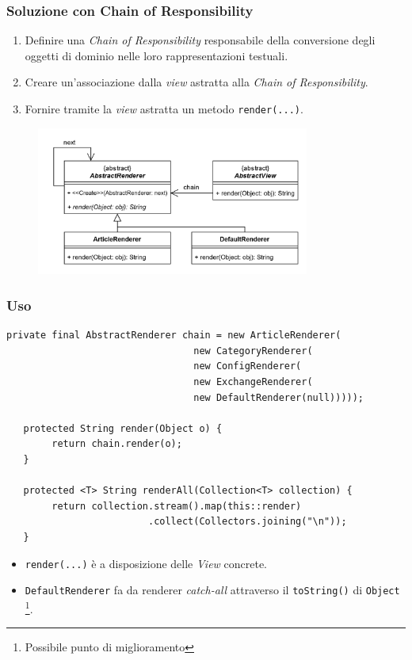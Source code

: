 \begin{frame}
    \frametitle{Soluzione con Chain of Responsibility}
    \begin{enumerate}
        \item Definire una \emph{Chain of Responsibility} responsabile della conversione degli oggetti
        di dominio nelle loro rappresentazioni testuali.
        \item Creare un'associazione dalla \emph{view} astratta alla \emph{Chain of Responsibility}.
        \item Fornire tramite la \emph{view} astratta un metodo \texttt{render(...)}.
    \end{enumerate}

    \begin{figure}
        \includegraphics[width=0.8\textwidth]{img/chain.png}
    \end{figure}
\end{frame}

\begin{frame}[fragile]
  \frametitle{Uso}
  \begin{lstlisting}[autogobble, title={\texttt{AbstractView.java}}]
   private final AbstractRenderer chain = new ArticleRenderer(
                                 new CategoryRenderer(
                                 new ConfigRenderer(
                                 new ExchangeRenderer(
                                 new DefaultRenderer(null)))));

   protected String render(Object o) {
        return chain.render(o);
   }

   protected <T> String renderAll(Collection<T> collection) {
        return collection.stream().map(this::render)
                         .collect(Collectors.joining("\n"));
   }
  \end{lstlisting}
    \begin{itemize}
        \item \texttt{render(...)} è a disposizione delle \emph{View} concrete.
        \item \texttt{DefaultRenderer} fa da renderer \emph{catch-all}
        attraverso il \texttt{toString()} di \texttt{Object} \footnote{Possibile punto di miglioramento}.
    \end{itemize}
\end{frame}

